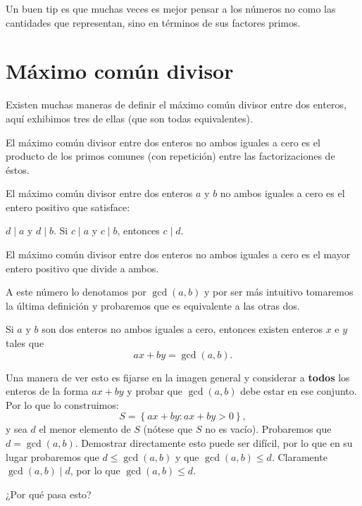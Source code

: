Un buen tip es que muchas veces es mejor
pensar a los números no como
las cantidades que representan, sino
en términos de sus factores primos.

\section{Máximo común divisor}
Existen muchas maneras de definir el
máximo común divisor entre dos
enteros, aquí exhibimos tres de ellas
(que son todas equivalentes).

\begin{definition}
	El máximo común divisor entre dos enteros
	no ambos iguales a cero
	es el producto de los primos comunes (con repetición)
	entre las factorizaciones de éstos.
\end{definition}

\begin{definition}
	El máximo común divisor
	entre dos enteros $a$ y $b$
	no ambos iguales a cero
	es el entero positivo que
	satisface:
	\begin{itemize}
		\ii $d \mid a$ y $d \mid b$.
		\ii Si $c \mid a$ y $c \mid b$, entonces $c \mid d$.
	\end{itemize}
\end{definition}

\begin{definition}
	El máximo común divisor entre dos enteros
	no ambos iguales a cero
	es el mayor entero positivo que
	divide a ambos.
\end{definition}

A este número lo denotamos por $\gcd (a, b)$
y por ser más intuitivo tomaremos
la última definición y probaremos
que es equivalente a las otras dos.

\begin{lemma}
	\label{lemma:bezout}
	Si $a$ y $b$ son dos enteros no ambos iguales a cero,
	entonces existen enteros $x$ e $y$ tales que
	\[ax + by = \gcd (a, b).\]
\end{lemma}

Una manera de ver esto es fijarse en la
imagen general y considerar a \textbf{todos}
los enteros de la forma $ax + by$
y probar que $\gcd (a, b)$ debe estar
en ese conjunto. Por lo que lo construimos:
\[S = \left\{ax + by \colon ax + by > 0\right\},\]
y sea $d$ el menor elemento de $S$ (nótese que
$S$ no es vacío). Probaremos que $d = \gcd (a, b)$.
Demostrar directamente esto puede ser difícil,
por lo que en su lugar probaremos que $d \leq \gcd(a, b)$
y que $\gcd (a, b) \leq d$.
Claramente $\gcd (a, b) \mid d$,
por lo que $\gcd (a, b) \leq d$.
\begin{question*}
	¿Por qué pasa esto?
\end{question*}

